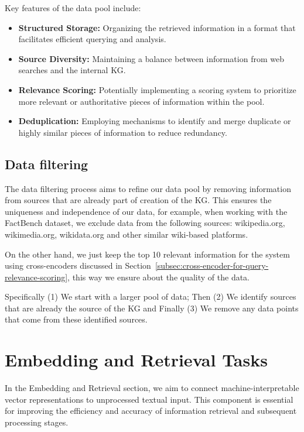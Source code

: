 Key features of the data pool include:
\begin{itemize}
    \item \textbf{Structured Storage:} Organizing the retrieved information in a format that facilitates efficient querying and analysis.
    \item \textbf{Source Diversity:} Maintaining a balance between information from web searches and the internal \ac{KG}.
    \item \textbf{Relevance Scoring:} Potentially implementing a scoring system to prioritize more relevant or authoritative pieces of information within the pool.
    \item \textbf{Deduplication:} Employing mechanisms to identify and merge duplicate or highly similar pieces of information to reduce redundancy.
\end{itemize}
\subsection{Data filtering}\label{subsec:data-filtering}
The data filtering process aims to refine our data pool by removing information from sources that are already part of creation of the \ac{KG}.
This ensures the uniqueness and independence of our data, for example, when working with the FactBench dataset, we exclude data from the following sources: wikipedia.org, wikimedia.org, wikidata.org and other similar wiki-based platforms.

On the other hand, we just keep the top 10 relevant information for the system using cross-encoders discussed in Section~\ref{subsec:cross-encoder-for-query-relevance-scoring}, this way we ensure about the quality of the data.

Specifically (1) We start with a larger pool of data; Then (2) We identify sources that are already the source of the \ac{KG} and Finally (3) We remove any data points that come from these identified sources.

\section{Embedding and Retrieval Tasks}\label{sec:embedding-and-retrieval-tasks}
In the Embedding and Retrieval section, we aim to connect machine-interpretable vector representations to unprocessed textual input.
This component is essential for improving the efficiency and accuracy of information retrieval and subsequent processing stages.

